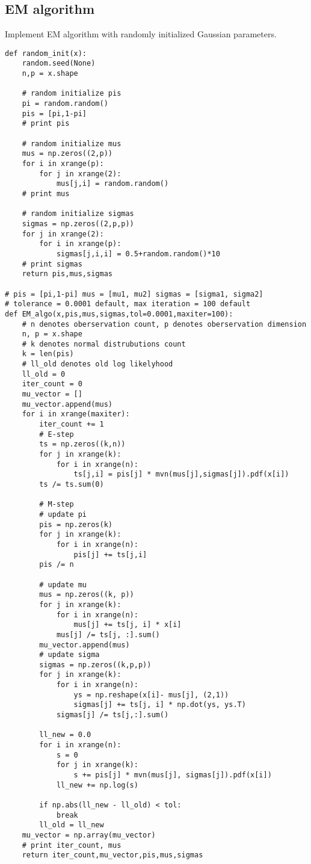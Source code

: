 \documentclass[a4paper]{article}
\begin{document}
\subsection*{EM algorithm}
Implement EM algorithm with randomly initialized Gaussian parameters.
\begin{lstlisting}
def random_init(x):
    random.seed(None)
    n,p = x.shape
    
    # random initialize pis
    pi = random.random()
    pis = [pi,1-pi]
    # print pis

    # random initialize mus
    mus = np.zeros((2,p))
    for i in xrange(p):
        for j in xrange(2):
            mus[j,i] = random.random()
    # print mus

    # random initialize sigmas
    sigmas = np.zeros((2,p,p))
    for j in xrange(2):
        for i in xrange(p):
            sigmas[j,i,i] = 0.5+random.random()*10
    # print sigmas
    return pis,mus,sigmas

# pis = [pi,1-pi] mus = [mu1, mu2] sigmas = [sigma1, sigma2]
# tolerance = 0.0001 default, max iteration = 100 default 
def EM_algo(x,pis,mus,sigmas,tol=0.0001,maxiter=100):
    # n denotes oberservation count, p denotes oberservation dimension
    n, p = x.shape
    # k denotes normal distrubutions count  
    k = len(pis)
    # ll_old denotes old log likelyhood
    ll_old = 0
    iter_count = 0
    mu_vector = []
    mu_vector.append(mus)
    for i in xrange(maxiter):
        iter_count += 1
        # E-step
        ts = np.zeros((k,n))
        for j in xrange(k):
            for i in xrange(n):
                ts[j,i] = pis[j] * mvn(mus[j],sigmas[j]).pdf(x[i])
        ts /= ts.sum(0)
        
        # M-step
        # update pi
        pis = np.zeros(k)
        for j in xrange(k):
            for i in xrange(n):
                pis[j] += ts[j,i]
        pis /= n

        # update mu
        mus = np.zeros((k, p))
        for j in xrange(k):
            for i in xrange(n):
                mus[j] += ts[j, i] * x[i]
            mus[j] /= ts[j, :].sum()
        mu_vector.append(mus)
        # update sigma
        sigmas = np.zeros((k,p,p))
        for j in xrange(k):
            for i in xrange(n):
                ys = np.reshape(x[i]- mus[j], (2,1))
                sigmas[j] += ts[j, i] * np.dot(ys, ys.T)
            sigmas[j] /= ts[j,:].sum()

        ll_new = 0.0
        for i in xrange(n):
            s = 0
            for j in xrange(k):
                s += pis[j] * mvn(mus[j], sigmas[j]).pdf(x[i])
            ll_new += np.log(s)

        if np.abs(ll_new - ll_old) < tol:
            break
        ll_old = ll_new
    mu_vector = np.array(mu_vector)
    # print iter_count, mus
    return iter_count,mu_vector,pis,mus,sigmas
    
\end{lstlisting}
\end{document}
